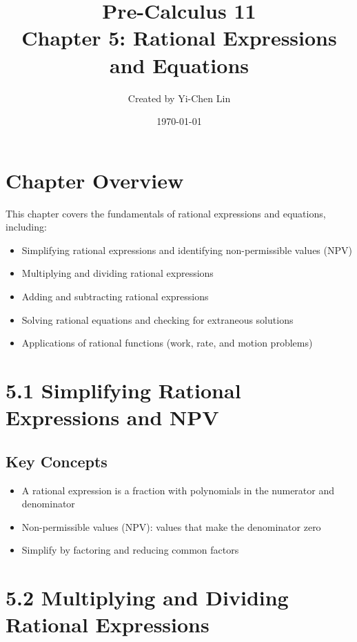 \documentclass[12pt]{article}
\title{Pre-Calculus 11 \\ Chapter 5: Rational Expressions and Equations}
\author{Created by Yi-Chen Lin}
\date{\today}
\begin{document}
\maketitle

\section*{Chapter Overview}
This chapter covers the fundamentals of rational expressions and equations, including:
\begin{itemize}
    \item Simplifying rational expressions and identifying non-permissible values (NPV)
    \item Multiplying and dividing rational expressions
    \item Adding and subtracting rational expressions
    \item Solving rational equations and checking for extraneous solutions
    \item Applications of rational functions (work, rate, and motion problems)
\end{itemize}

\section{5.1 Simplifying Rational Expressions and NPV}
\subsection*{Key Concepts}
\begin{tcolorbox}[colback=lightgray,colframe=primary,title=Rational Expressions]
    \begin{itemize}
        \item A rational expression is a fraction with polynomials in the numerator and denominator
        \item Non-permissible values (NPV): values that make the denominator zero
        \item Simplify by factoring and reducing common factors
    \end{itemize}
\end{tcolorbox}

\section{5.2 Multiplying and Dividing Rational Expressions}
\end{document}
